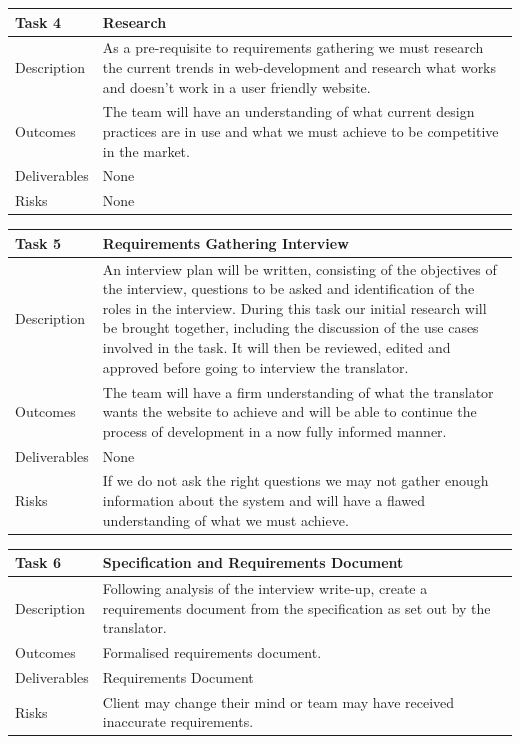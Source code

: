 \documentclass{l3proj}
\begin{document}
\begin{center}
    \begin{tabular}{ | l | p{12cm} |}
    \hline	
    Task 4 & Research \\ \hline
    Description & As a pre-requisite to requirements gathering we must research the current trends in web-development and research what works and doesn't work in a user friendly website. \\ \hline   
    Outcomes & The team will have an understanding of what current design practices are in use and what we must achieve to be competitive in the market. \\ \hline
    Deliverables & None \\ \hline
    Risks & None \\ 
    \hline
    \end{tabular}
\end{center}

\begin{center}
    \begin{tabular}{ | l | p{12cm} |}
    \hline	
    Task 5 & Requirements Gathering Interview \\ \hline
    Description & An interview plan will be written, consisting
          of the objectives of the interview, questions to be asked and
          identification of the roles in the interview. During this task our initial research will be brought together, including the discussion of the use cases involved in the task. It will then be
          reviewed, edited and approved before going to interview the translator. \\ \hline   
    Outcomes & The team will have a firm understanding of what the translator wants the website to achieve and will be able to continue the process of development in a now fully informed manner. \\ \hline
    Deliverables & None \\ \hline
    Risks & If we do not ask the right questions we may not gather enough information about the system and will have a flawed understanding of what we must achieve. \\ 
    \hline
    \end{tabular}
\end{center}

\begin{center}
    \begin{tabular}{ | l | p{12cm} |}
    \hline	
    Task 6 & Specification and Requirements Document \\ \hline
    Description & Following analysis of the interview write-up, create a requirements document from the specification as set out by the translator. \\ \hline   
    Outcomes & Formalised requirements document. \\ \hline
    Deliverables & Requirements Document \\ \hline
    Risks & Client may change their mind or team may have received inaccurate requirements. \\ 
    \hline
    \end{tabular}
\end{center}
\end{document}
